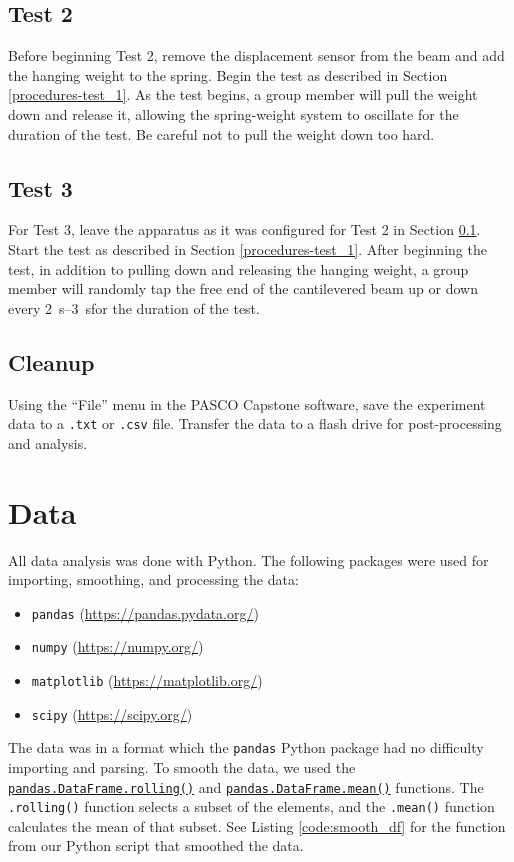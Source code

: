 \documentclass[12 pt]{report}
\begin{document}
\subsection{Test 2} \label{procedures-test_2}
Before beginning Test 2, remove the displacement sensor from the beam and add the hanging weight to the spring. Begin the test as described in Section \ref{procedures-test_1}. As the test begins, a group member will pull the weight down and release it, allowing the spring-weight system to oscillate for the duration of the test. Be careful not to pull the weight down too hard.

\subsection{Test 3} \label{procedures-test_3}
For Test 3, leave the apparatus as it was configured for Test 2 in Section \ref{procedures-test_2}. Start the test as described in Section \ref{procedures-test_1}. After beginning the test, in addition to pulling down and releasing the hanging weight, a group member will randomly tap the free end of the cantilevered beam up or down every \qtyrange{2}{3}{\s}for the duration of the test.

\subsection{Cleanup} \label{procedures-cleanup}
Using the ``File'' menu in the PASCO Capstone software, save the experiment data to a \texttt{.txt} or \texttt{.csv} file. Transfer the data to a flash drive for post-processing and analysis.

\section{Data} \label{data}
All data analysis was done with Python. The following packages were used for importing, smoothing, and processing the data:

\begin{itemize}
	\item \texttt{pandas} (\url{https://pandas.pydata.org/})
	\item \texttt{numpy} (\url{https://numpy.org/})
	\item \texttt{matplotlib} (\url{https://matplotlib.org/})
	\item \texttt{scipy} (\url{https://scipy.org/})
\end{itemize}

The data was in a  format which the \texttt{pandas} Python package had no difficulty importing and parsing. To smooth the data, we used the \href{https://pandas.pydata.org/pandas-docs/stable/reference/api/pandas.DataFrame.rolling.html}{\texttt{pandas.DataFrame.rolling()}} and \href{https://pandas.pydata.org/pandas-docs/stable/reference/api/pandas.DataFrame.mean.html}{\texttt{pandas.DataFrame.mean()}} functions. The \texttt{.rolling()} function selects a subset of the elements, and the \texttt{.mean()} function calculates the mean of that subset. See Listing \ref{code:smooth_df} for the function from our Python script that smoothed the data.
\end{document}
